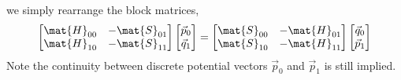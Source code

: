 \documentclass{jfm}
\begin{document}
we simply rearrange the block matrices,
\begin{equation}
\begin{bmatrix}
\mat{H}_{00}&-\mat{S}_{01}\\\mat{H}_{10}&-\mat{S}_{11}
\end{bmatrix}
\begin{bmatrix}
\vec{p}_0\\\vec{q}_1
\end{bmatrix}
=\begin{bmatrix}
\mat{S}_{00}&-\mat{H}_{01}\\\mat{S}_{10}&-\mat{H}_{11}
\end{bmatrix}
\begin{bmatrix}
\vec{q}_0\\\vec{p}_1
\end{bmatrix}
\end{equation}
Note the continuity between discrete potential vectors $\vec{p}_0$ and $\vec{p}_1$
is still implied.
\end{document}
